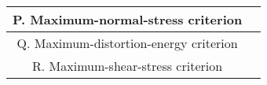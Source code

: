 \begin{tabular}{|c|c|}
    \hline
    P. Maximum-normal-stress criterion &  \\ 
    \hline
    Q. Maximum-distortion-energy criterion &  \\
    \hline
    R. Maximum-shear-stress criterion &  \\
    \hline
\end{tabular}


